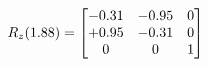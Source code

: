 \documentclass[preview]{standalone}
\begin{document}
\begin{align*}
\special{dvisvgm:raw <g id='unique000'>}R_{z}(1.88) = \begin{bmatrix}-0.31 & -0.95 & 0 \\+0.95 & -0.31 & 0 \\0 & 0 & 1\end{bmatrix}\special{dvisvgm:raw </g>}
\end{align*}
\end{document}

